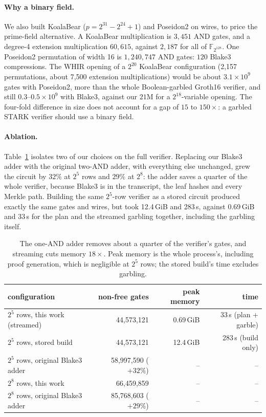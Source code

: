 \documentclass[11pt]{article}
\newcommand{\F}{\mathbb{F}_{2^{128}}}
\newcommand{\AND}{\textsf{AND}}
\begin{document}
\paragraph{Why a binary field.} We also built KoalaBear
($p=2^{31}-2^{24}+1$) and Poseidon2 on wires, to price the prime-field
alternative. A KoalaBear multiplication is $3{,}451$ \AND{} gates, and a
degree-4 extension multiplication $60{,}615$, against $2{,}187$ for all of
$\F$. One Poseidon2 permutation of width 16 is $1{,}240{,}747$ \AND{} gates:
$120$ Blake3 compressions. The WHIR opening of a $2^{20}$ KoalaBear
configuration (2{,}157 permutations, about 7{,}500 extension multiplications)
would be about $3.1\times10^9$ gates with Poseidon2, more than the whole
Boolean-garbled Groth16 verifier, and still $0.3$--$0.5\times10^9$ with Blake3,
against our $21$M for a $2^{18}$-variable opening. The four-fold difference in
size does not account for a gap of $15$ to $150\times$: a garbled STARK verifier
should use a binary field.

\paragraph{Ablation.} Table~\ref{tab:ablation} isolates two of our choices on
the full verifier. Replacing our Blake3 adder with the original two-\AND{} adder,
with everything else unchanged, grew the circuit by $32\%$ at $2^5$ rows and
$29\%$ at $2^8$: the adder saves a quarter of the whole verifier, because Blake3
is in the transcript, the leaf hashes and every Merkle path. Building the same
$2^5$-row verifier as a stored circuit produced exactly the same gates and wires,
but took 12.4\,GiB and 283\,s, against 0.69\,GiB and 33\,s for the plan and the
streamed garbling together, including the garbling itself.

\begin{table}[t]\centering\small
\begin{tabular}{lrrr}\toprule
configuration & non-free gates & peak memory & time\\\midrule
$2^5$ rows, this work (streamed) & 44{,}573{,}121 & 0.69\,GiB & 33\,s (plan + garble)\\
$2^5$ rows, stored build & 44{,}573{,}121 & 12.4\,GiB & 283\,s (build only)\\
$2^5$ rows, original Blake3 adder & 58{,}997{,}590 ($+32\%$) & -- & --\\\midrule
$2^8$ rows, this work & 66{,}459{,}859 & -- & --\\
$2^8$ rows, original Blake3 adder & 85{,}768{,}603 ($+29\%$) & -- & --\\\bottomrule
\end{tabular}
\caption{The one-\AND{} adder removes about a quarter of the verifier's gates, and
streaming cuts memory $18\times$. Peak memory is the whole process's, including
proof generation, which is negligible at $2^5$ rows; the stored build's time
excludes garbling.}
\label{tab:ablation}
\end{table}
\end{document}
